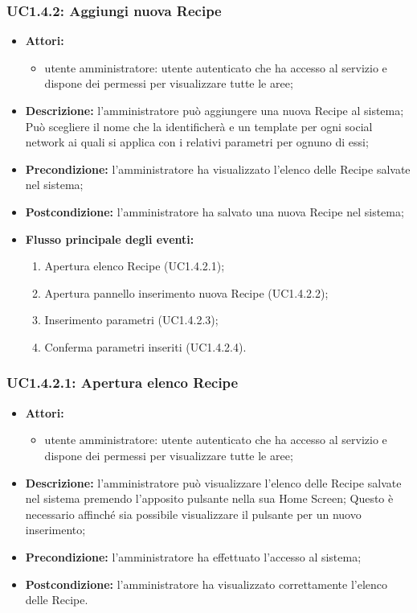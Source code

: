 \subsubsection{UC1.4.2: Aggiungi nuova Recipe}
\begin{itemize}
	\item \textbf{Attori:}
	\begin{itemize}
		\item utente amministratore: utente autenticato che ha accesso al servizio e dispone dei permessi per visualizzare tutte le aree;
	\end{itemize}
	\item \textbf{Descrizione:} l'amministratore può aggiungere una nuova Recipe al sistema; Può scegliere il nome che la identificherà e un template per ogni social network ai quali si applica con i relativi parametri per ognuno di essi;
	\item \textbf{Precondizione:} l'amministratore ha visualizzato l'elenco delle Recipe salvate nel sistema;
	\item \textbf{Postcondizione:} l'amministratore ha salvato una nuova Recipe nel sistema;
	\item \textbf{Flusso principale degli eventi:}
	\begin{enumerate}
		\item Apertura elenco Recipe (UC1.4.2.1);
		\item Apertura pannello inserimento nuova Recipe (UC1.4.2.2);
		\item Inserimento parametri (UC1.4.2.3);
		\item Conferma parametri inseriti (UC1.4.2.4).
	\end{enumerate}
\end{itemize}
\subsubsection{UC1.4.2.1: Apertura elenco Recipe}

\begin{itemize}
	\item \textbf{Attori:}
	\begin{itemize}
		\item utente amministratore: utente autenticato che ha accesso al servizio e dispone dei permessi per visualizzare tutte le aree;
	\end{itemize}
	\item \textbf{Descrizione:} l'amministratore può visualizzare l'elenco delle Recipe salvate nel sistema premendo l'apposito pulsante nella sua Home Screen; Questo è necessario affinché sia possibile visualizzare il pulsante per un nuovo inserimento;
	\item \textbf{Precondizione:} l'amministratore ha effettuato l'accesso al sistema;
	\item \textbf{Postcondizione:} l'amministratore ha visualizzato correttamente l'elenco delle Recipe.
\end{itemize}

